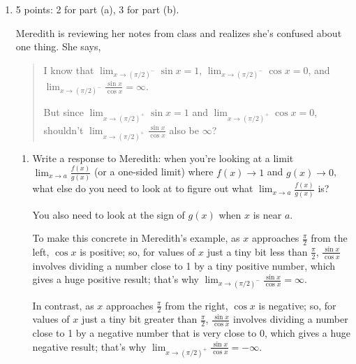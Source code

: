 \documentclass{article}
\begin{document}
\begin{enumerate}
\begin{enumerate}
  \end{enumerate}

\pspace{\newpage}

\item 

\begin{grading}
5 points: 2 for part (a), 3 for part (b).
\end{grading}

  Meredith is reviewing her notes from class and realizes she's
  confused about one thing.  She says,
  \begin{quote}
    I know that $\displaystyle \lim_{x \to (\pi/2)^-} \sin x = 1$,
    $\displaystyle \lim_{x \to (\pi/2)^-} \cos x = 0$, and $\displaystyle
    \lim_{x \to (\pi/2)^-} \frac{\sin x}{\cos x} = \infty$.

    But since $\displaystyle \lim_{x \to (\pi/2)^+} \sin x = 1$ and
    $\displaystyle \lim_{x \to (\pi/2)^+} \cos x = 0$, shouldn't
    $\displaystyle \lim_{x \to (\pi/2)^+} \frac{\sin x}{\cos x}$ also be
    $\infty$?
  \end{quote}

  \begin{enumerate}
  \item
    \begin{problem}[\stretch{0.75}]
      Write a response to Meredith: when you're looking at a limit
      $\displaystyle \lim_{x \to a} \frac{f(x)}{g(x)}$ (or a one-sided
      limit) where $f(x) \to
      1$ and $g(x) \to 0$, what else do you need to look at to figure out
      what $\displaystyle \lim_{x \to a} \frac{f(x)}{g(x)}$ is?  
    \end{problem}

    \begin{solution}
      You also need to look at the sign of $g(x)$ when $x$ is near $a$.

      To make this concrete in Meredith's example, as $x$ approaches
      $\frac{\pi}{2}$ from the left, $\cos x$ is positive; so, for values
      of $x$ just a tiny bit less than $\frac{\pi}{2}$, $\frac{\sin
        x}{\cos x}$ involves dividing a number close to 1 by a tiny
      positive number, which gives a huge positive result; that's why
      $\displaystyle \lim_{x \to (\pi/2)^-} \frac{\sin x}{\cos x} =
      \infty$.

      In contrast, as $x$ approaches $\frac{\pi}{2}$ from the right, $\cos
      x$ is negative; so, for values of $x$ just a tiny bit greater than
      $\frac{\pi}{2}$, $\frac{\sin x}{\cos x}$ involves dividing a number
      close to 1 by a negative number that is very close to 0, which gives
      a huge negative result; that's why $\displaystyle \lim_{x \to
        (\pi/2)^+} \frac{\sin x}{\cos x} = -\infty$.
    \end{solution}


\end{enumerate}
\end{enumerate}
\end{document}
